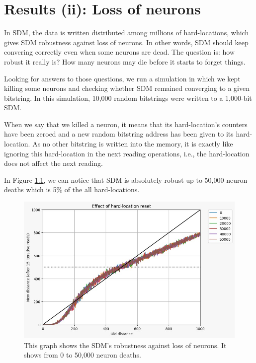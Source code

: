 


\chapter{Results (ii): Loss of neurons}

In SDM, the data is written distributed among millions of hard-locations, which gives SDM robustness against loss of neurons. In other words, SDM should keep convering correctly even when some neurons are dead. The question is: how robust it really is? How many neurons may die before it starts to forget things.

Looking for answers to those questions, we run a simulation in which we kept killing some neurons and checking whether SDM remained converging to a given bitstring. In this simulation, 10,000 random bitstrings were written to a 1,000-bit SDM.

When we say that we killed a neuron, it means that its hard-location's counters have been zeroed and a new random bitstring address has been given to its hard-location. As no other bitstring is written into the memory, it is exactly like ignoring this hard-location in the next reading operations, i.e., the hard-location does not affect the next reading.

In Figure \ref{fig:sdm-neuron-death-50k}, we can notice that SDM is absolutely robust up to 50,000 neuron deaths which is 5\% of the all hard-locations.

\begin{figure}[h]
\centering\includegraphics[width=\textwidth]{./images02/new-images/sdm-neuron-death-50k.png}
\caption{This graph shows the SDM's robustness against loss of neurons. It shows from 0 to 50,000 neuron deaths.
\label{fig:sdm-neuron-death-50k}}
\end{figure}

